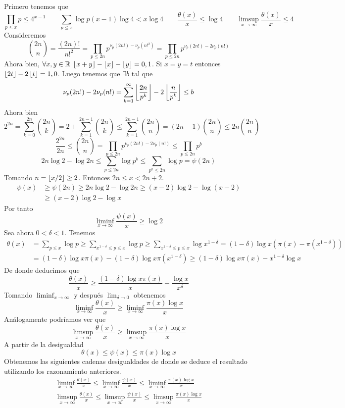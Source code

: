 \documentclass[TAN.tex]{subfiles}
\begin{document}
\begin{dem}
Primero tenemos que
$$
\prod_{p\leq x}p\leq 4^{x-1} \qquad \sum_{p\leq x}\log p (x-1)\log 4 <  x \log 4 \qquad \frac{\theta(x)}{x} \leq \log 4 \qquad \limsup_{x\to\infty} \frac{\theta(x)}{x} \leq 4
$$
Consideremos 
$$
\binom{2n}{n} =  \frac{(2n)!}{n!^2} = \prod_{p\leq 2n} p^{\nu_p(2n!)-\nu_p(n!^2)} = \prod_{p\leq 2n} p^{\nu_p(2n!)-2\nu_p(n!)}
$$
Ahora bien, $\forall x,y \in \mathbb{R}$ $\left\lfloor{x+y}\right\rfloor-\left\lfloor{x}\right\rfloor-\left\lfloor{y}\right\rfloor=0,1$. Si $x=y=t$ entonces $\left\lfloor{2t}\right\rfloor-2\left\lfloor{t}\right\rfloor=1,0$. Luego tenemos que $\exists b$ tal que
$$
\nu_p(2n!)-2\nu_p(n!) = \sum_{k=1}^\infty \left\lfloor{\frac{2n}{p^k}}\right\rfloor-2\left\lfloor{\frac{n}{p^k}}\right\rfloor  \leq b
$$
Ahora bien 
$$
2^{2n}=\sum_{k=0}^{2n} \binom{2n}{k} = 2 + \sum_{k=1}^{2n-1} \binom{2n}{k} \leq \sum_{k=1}^{2n-1} \binom{2n}{n} = (2n-1)\binom{2n}{n} \leq 2n\binom{2n}{n} 
$$
$$
 \frac{2^{2n}}{2n} \leq \binom{2n}{n} =  \prod_{p\leq 2n} p^{\nu_p(2n!)-2\nu_p(n!)} \leq \prod_{p\leq 2n} p^b $$
 $$
  2n\log 2 -\log 2n \leq \sum_{p\leq 2n}\log p^b \leq \sum_{p^k\leq 2n}\log p= \psi(2n)
$$
Tomando $n=\left\lfloor{x/2}\right\rfloor\geq 2$. Entonces $2n\leq x < 2n+2$.
\begin{align*}
\psi(x)&\geq \psi(2n) \geq 2n\log 2-\log 2n \geq (x-2)\log 2-\log (x-2)\\
&\geq (x-2)\log 2 - \log x
\end{align*}
Por tanto
$$
\liminf_{x\to\infty} \frac{\psi(x)}{x}\geq \log 2
$$
Sea ahora $0<\delta < 1$. Tenemos
\begin{align*}
\theta(x)&=\sum_{p\leq x}\log p\geq\sum_{x^{1-\delta}\leq p\leq x} \log p \geq \sum_{x^{1-\delta}\leq p\leq x}\log x^{1-\delta}  = (1-\delta)\log x(\pi(x)-\pi(x^{1-\delta}))\\
&=(1-\delta)\log x\pi(x)-(1-\delta)\log x \pi(x^{1-\delta}) \geq (1-\delta)\log x \pi(x)- x^{1-\delta}\log x
\end{align*}
De donde deducimos que
$$
\frac{\theta(x)}{x} \geq \frac{(1-\delta)\log x \pi(x)}{x}-\frac{\log x}{x^{\delta}}
$$
Tomando $\liminf_{x\to\infty}$ y después $\lim_{\delta \to 0}$ obtenemos
$$
\liminf_{x\to\infty}\frac{\theta(x)}{x}\geq \liminf_{x\to\infty}\frac{\pi(x)\log x}{x}
$$
Análogamente podríamos ver que
$$
\limsup_{x\to\infty}\frac{\theta(x)}{x}\geq \limsup_{x\to\infty}\frac{\pi(x)\log x}{x}
$$
A partir de la desigualdad
$$
\theta(x)\leq \psi(x) \leq \pi(x)\log x 
$$
Obtenemos las siguientes cadenas desigualdades de donde se deduce el resultado utilizando los razonamiento anteriores.
\begin{gather*}
\liminf_{x\to\infty} \frac{\theta(x)}{x} \leq \liminf_{x\to\infty} \frac{\psi(x)}{x} \leq \liminf_{x\to\infty}\frac{\pi(x)\log x}{x}\\
\limsup_{x\to\infty} \frac{\theta(x)}{x} \leq \limsup_{x\to\infty} \frac{\psi(x)}{x} \leq \limsup_{x\to\infty}\frac{\pi(x)\log x}{x}
\end{gather*}
\end{dem}
\newpage
\end{document}
